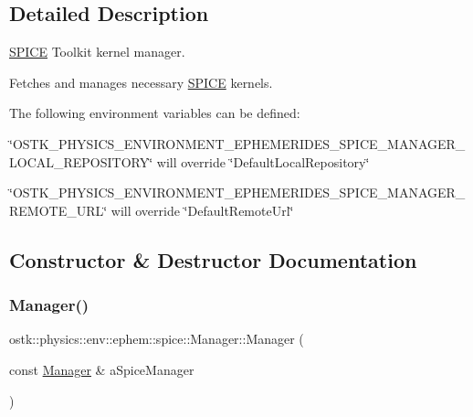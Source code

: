 \subsection{Detailed Description}
\hyperlink{classostk_1_1physics_1_1env_1_1ephem_1_1_s_p_i_c_e}{S\+P\+I\+CE} Toolkit kernel manager. 

Fetches and manages necessary \hyperlink{classostk_1_1physics_1_1env_1_1ephem_1_1_s_p_i_c_e}{S\+P\+I\+CE} kernels.

The following environment variables can be defined\+:


\begin{DoxyItemize}
\item \char`\"{}\+O\+S\+T\+K\+\_\+\+P\+H\+Y\+S\+I\+C\+S\+\_\+\+E\+N\+V\+I\+R\+O\+N\+M\+E\+N\+T\+\_\+\+E\+P\+H\+E\+M\+E\+R\+I\+D\+E\+S\+\_\+\+S\+P\+I\+C\+E\+\_\+\+M\+A\+N\+A\+G\+E\+R\+\_\+\+L\+O\+C\+A\+L\+\_\+\+R\+E\+P\+O\+S\+I\+T\+O\+R\+Y\char`\"{} will override \char`\"{}\+Default\+Local\+Repository\char`\"{}
\item \char`\"{}\+O\+S\+T\+K\+\_\+\+P\+H\+Y\+S\+I\+C\+S\+\_\+\+E\+N\+V\+I\+R\+O\+N\+M\+E\+N\+T\+\_\+\+E\+P\+H\+E\+M\+E\+R\+I\+D\+E\+S\+\_\+\+S\+P\+I\+C\+E\+\_\+\+M\+A\+N\+A\+G\+E\+R\+\_\+\+R\+E\+M\+O\+T\+E\+\_\+\+U\+R\+L\char`\"{} will override \char`\"{}\+Default\+Remote\+Url\char`\"{} 
\end{DoxyItemize}

\subsection{Constructor \& Destructor Documentation}
\mbox{\label{classostk_1_1physics_1_1env_1_1ephem_1_1spice_1_1_manager_a20d663efed8e9d8604c8b86d055e905b}} 
\subsubsection{\texorpdfstring{Manager()}{Manager()}}
{\footnotesize\ttfamily ostk\+::physics\+::env\+::ephem\+::spice\+::\+Manager\+::\+Manager (\begin{DoxyParamCaption}\item[{const \hyperlink{classostk_1_1physics_1_1env_1_1ephem_1_1spice_1_1_manager}{Manager} \&}]{a\+Spice\+Manager }\end{DoxyParamCaption})\hspace{0.3cm}{\ttfamily [delete]}}



